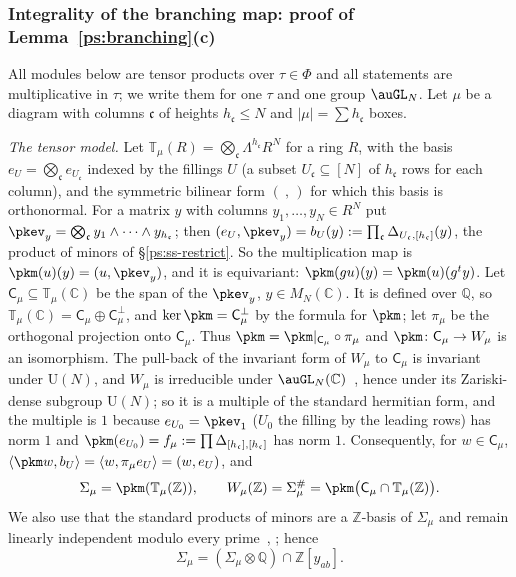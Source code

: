\documentclass[10pt]{amsart}
\theoremstyle{definition}
\theoremstyle{remark}
\newcommand{\C}{\mathbb C}
\newcommand{\Z}{\mathbb Z}
\newcommand{\Q}{\mathbb Q}
\providecommand{\auPl}{\Phi}
\providecommand{\auU}{\mathrm U}
\begin{document}
\subsubsection{Integrality of the branching map: proof of Lemma~\ref{ps:branching}(c)}
\label{pk:ss-branch}

All modules below are tensor products over $\tau\in\auPl$ and all statements are multiplicative
in $\tau$; we write them for one $\tau$ and one group $\auGL_N$. Let $\mu$ be a diagram with
columns $\mathfrak c$ of heights $h_{\mathfrak c}\le N$ and $|\mu|=\sum h_{\mathfrak c}$ boxes.

\emph{The tensor model.} Let $\mathbb T_\mu(R)=\bigotimes_{\mathfrak c}\Lambda^{h_{\mathfrak c}}R^N$
for a ring $R$, with the basis $e_U=\bigotimes_{\mathfrak c}e_{U_{\mathfrak c}}$ indexed by the
fillings $U$ (a subset $U_{\mathfrak c}\subseteq[N]$ of $h_{\mathfrak c}$ rows for each column), and
the symmetric bilinear form $(\ ,\,)$ for which this basis is orthonormal. For a matrix $y$ with
columns $y_1,\dots,y_N\in R^N$ put $\pkev_y=\bigotimes_{\mathfrak c}y_1\wedge\dots\wedge
y_{h_{\mathfrak c}}$; then $(e_U,\pkev_y)=b_U(y):=\prod_{\mathfrak c}\Delta_{U_{\mathfrak c},
[h_{\mathfrak c}]}(y)$, the product of minors of \S\ref{ps:ss-restrict}. So the multiplication map
is $\pkm(u)(y)=(u,\pkev_y)$, and it is equivariant: $\pkm(gu)(y)=\pkm(u)(g^ty)$. Let
$\mathsf C_\mu\subseteq\mathbb T_\mu(\C)$ be the span of the $\pkev_y$, $y\in M_N(\C)$. It is
defined over $\Q$, so $\mathbb T_\mu(\C)=\mathsf C_\mu\oplus\mathsf C_\mu^\perp$, and
$\ker\pkm=\mathsf C_\mu^\perp$ by the formula for $\pkm$; let $\pi_\mu$ be the orthogonal projection
onto $\mathsf C_\mu$. Thus $\pkm=\pkm|_{\mathsf C_\mu}\circ\pi_\mu$ and $\pkm\colon\mathsf C_\mu\to
W_\mu$ is an isomorphism. The pull-back of the invariant form of $W_\mu$ to $\mathsf C_\mu$ is
invariant under $\auU(N)$, and $W_\mu$ is irreducible under $\auGL_N(\C)$~\cite[\S8.1, Thm.~1 and its corollary; \S8.2, Thm.~2]{FultonYT}, hence under its Zariski-dense subgroup $\auU(N)$; so it is a multiple of
the standard hermitian form, and the multiple is $1$ because $e_{U_0}=\pkev_1$ ($U_0$ the filling
by the leading rows) has norm $1$ and $\pkm(e_{U_0})=f_\mu:=\prod\Delta_{[h_{\mathfrak c}],
[h_{\mathfrak c}]}$ has norm $1$. Consequently, for $w\in\mathsf C_\mu$,
$\langle\pkm w,b_U\rangle=\langle w,\pi_\mu e_U\rangle=(w,e_U)$, and
\begin{equation}\label{pk:eq-dual}
\Sigma_\mu=\pkm(\mathbb T_\mu(\Z)),\qquad W_\mu(\Z)=\Sigma_\mu^\#=\pkm\bigl(\mathsf C_\mu\cap
\mathbb T_\mu(\Z)\bigr).
\end{equation}
We also use that the standard products of minors are a $\Z$-basis of $\Sigma_\mu$ and remain
linearly independent modulo every prime~\cite[Thm.~2.1]{DEP}, \cite[\S8.1, Thm.~1 and its corollary]{FultonYT}; hence
\begin{equation}\label{pk:eq-sat}
\Sigma_\mu=(\Sigma_\mu\otimes\Q)\cap\Z[y_{ab}] .
\end{equation}
\end{document}
